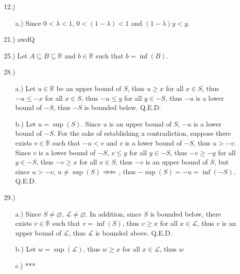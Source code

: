\documentclass[12pt]{article}
\newcommand{\contradiction}{
    \ensuremath{{\Rightarrow\mspace{-2mu}\Leftarrow}}
}
\begin{document}
\pagestyle{fancy}
\fancyhead{}

\normalsize
\begin{itemize}
    \item [12.)] \begin{itemize}
        \item [a.)] Since $0<\lambda<1$, $0<(1-\lambda)<1$ and $(1-\lambda)y < y$.
    \end{itemize}

    \item [21.)] awdQ

    \item [25.)] Let $A\subseteq B\subseteq\mathbb{R}$ and $b\in\mathbb{R}$ such that $b=\inf(B)$.

    \item [28.)] \begin{itemize}
        \item [a.)] Let $u\in\mathbb{R}$ be an upper bound of $S$, thus $u\geq x$ for all $x\in S$, thus $-u\leq-x$ for all $x\in S$, thus $-u\leq y$ for all $y\in-S$, thus $-u$ is a lower bound of $-S$, thus $-S$ is bounded below. Q.E.D.

        \item [b.)] Let $u=\sup(S)$. Since $u$ is an upper bound of $S$, $-u$ is a lower bound of $-S$. For the sake of establishing a contradiction, suppose there exists $v\in\mathbb{R}$ such that $-u<v$ and $v$ is a lower bound of $-S$, thus $u>-v$. Since $v$ is a lower bound of $-S$, $v\leq y$ for all $y\in-S$, thus $-v\geq-y$ for all $y\in-S$, thus $-v\geq x$ for all $x\in S$, thus $-v$ is an upper bound of $S$, but since $u>-v$, $u\neq\sup(S)$\contradiction, thus $-\sup(S)=-u=\inf(-S)$. Q.E.D.
    \end{itemize}

    \item [29.)] \begin{itemize}
        \item [a.)] Since $S\neq\varnothing$, $\mathscr{L}\neq\varnothing$. In addition, since $S$ is bounded below, there exists $v\in\mathbb{R}$ such that $v=\inf(S)$, thus $v\geq x$ for all $x\in\mathscr{L}$, thus $v$ is an upper bound of $\mathscr{L}$, thus $\mathscr{L}$ is bounded above. Q.E.D.

        \item [b.)] Let $w=\sup(\mathscr{L})$, thus $w\geq x$ for all $x\in\mathscr{L}$, thus $w$

        \item [c.)] ***
    \end{itemize}


\end{itemize}
\end{document}
